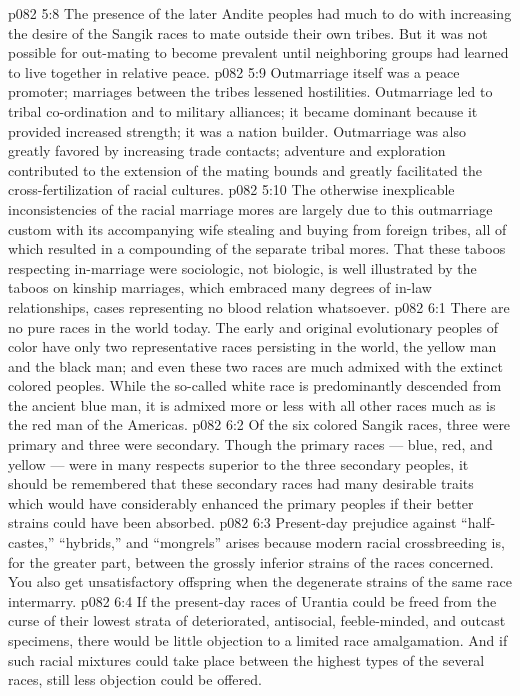 \vs p082 5:8 The presence of the later Andite peoples had much to do with increasing the desire of the Sangik races to mate outside their own tribes. But it was not possible for out\hyp{}mating to become prevalent until neighboring groups had learned to live together in relative peace.
\vs p082 5:9 Outmarriage itself was a peace promoter; marriages between the tribes lessened hostilities. Outmarriage led to tribal co\hyp{}ordination and to military alliances; it became dominant because it provided increased strength; it was a nation builder. Outmarriage was also greatly favored by increasing trade contacts; adventure and exploration contributed to the extension of the mating bounds and greatly facilitated the cross\hyp{}fertilization of racial cultures.
\vs p082 5:10 The otherwise inexplicable inconsistencies of the racial marriage mores are largely due to this outmarriage custom with its accompanying wife stealing and buying from foreign tribes, all of which resulted in a compounding of the separate tribal mores. That these taboos respecting in\hyp{}marriage were sociologic, not biologic, is well illustrated by the taboos on kinship marriages, which embraced many degrees of in\hyp{}law relationships, cases representing no blood relation whatsoever.
\vs p082 6:1 There are no pure races in the world today. The early and original evolutionary peoples of color have only two representative races persisting in the world, the yellow man and the black man; and even these two races are much admixed with the extinct colored peoples. While the so\hyp{}called white race is predominantly descended from the ancient blue man, it is admixed more or less with all other races much as is the red man of the Americas.
\vs p082 6:2 Of the six colored Sangik races, three were primary and three were secondary. Though the primary races --- blue, red, and yellow --- were in many respects superior to the three secondary peoples, it should be remembered that these secondary races had many desirable traits which would have considerably enhanced the primary peoples if their better strains could have been absorbed.
\vs p082 6:3 Present\hyp{}day prejudice against “half\hyp{}castes,” “hybrids,” and “mongrels” arises because modern racial crossbreeding is, for the greater part, between the grossly inferior strains of the races concerned. You also get unsatisfactory offspring when the degenerate strains of the same race intermarry.
\vs p082 6:4 If the present\hyp{}day races of Urantia could be freed from the curse of their lowest strata of deteriorated, antisocial, feeble\hyp{}minded, and outcast specimens, there would be little objection to a limited race amalgamation. And if such racial mixtures could take place between the highest types of the several races, still less objection could be offered.
